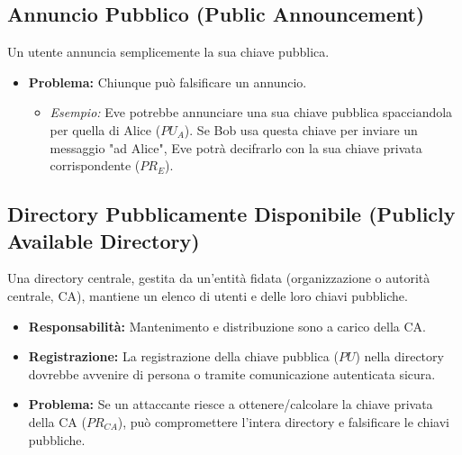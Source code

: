 \subsection{Annuncio Pubblico (Public Announcement)}
Un utente annuncia semplicemente la sua chiave pubblica.
\begin{itemize}
    \item \textbf{Problema:} Chiunque può falsificare un annuncio.
        \begin{itemize}
            \item \textit{Esempio:} Eve potrebbe annunciare una sua chiave pubblica spacciandola per quella di Alice ($PU_A$). Se Bob usa questa chiave per inviare un messaggio "ad Alice", Eve potrà decifrarlo con la sua chiave privata corrispondente ($PR_E$).
        \end{itemize}
\end{itemize}

\subsection{Directory Pubblicamente Disponibile (Publicly Available Directory)}
Una directory centrale, gestita da un'entità fidata (organizzazione o autorità centrale, CA), mantiene un elenco di utenti e delle loro chiavi pubbliche.
\begin{itemize}
    \item \textbf{Responsabilità:} Mantenimento e distribuzione sono a carico della CA.
    \item \textbf{Registrazione:} La registrazione della chiave pubblica ($PU$) nella directory dovrebbe avvenire di persona o tramite comunicazione autenticata sicura.
    \item \textbf{Problema:} Se un attaccante riesce a ottenere/calcolare la chiave privata della CA ($PR_{CA}$), può compromettere l'intera directory e falsificare le chiavi pubbliche.
\end{itemize}

